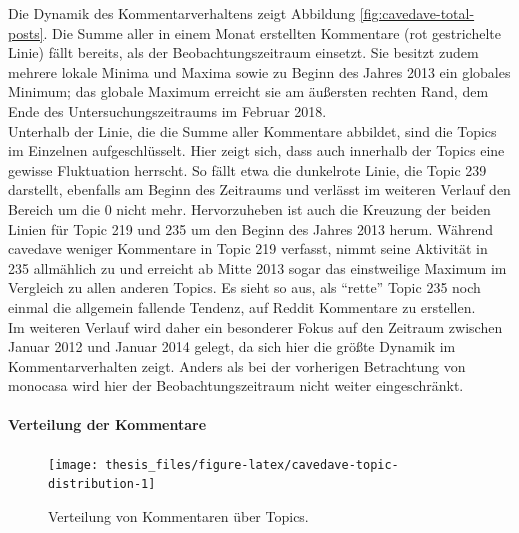 \documentclass[11pt,a4paper,twoside]{article}
\let\oldpar\paragraph
\renewcommand{\paragraph}{\oldpar*}
\begin{document}
Die Dynamik des Kommentarverhaltens zeigt Abbildung
\ref{fig:cavedave-total-posts}. Die Summe aller in einem Monat
erstellten Kommentare (rot gestrichelte Linie) fällt bereits, als der
Beobachtungszeitraum einsetzt. Sie besitzt zudem mehrere lokale Minima
und Maxima sowie zu Beginn des Jahres 2013 ein globales Minimum; das
globale Maximum erreicht sie am äußersten rechten Rand, dem Ende des
Untersuchungszeitraums im Februar 2018.\\
Unterhalb der Linie, die die Summe aller Kommentare abbildet, sind die
Topics im Einzelnen aufgeschlüsselt. Hier zeigt sich, dass auch
innerhalb der Topics eine gewisse Fluktuation herrscht. So fällt etwa
die dunkelrote Linie, die Topic 239 darstellt, ebenfalls am Beginn des
Zeitraums und verlässt im weiteren Verlauf den Bereich um die 0 nicht
mehr. Hervorzuheben ist auch die Kreuzung der beiden Linien für Topic
219 und 235 um den Beginn des Jahres 2013 herum. Während cavedave
weniger Kommentare in Topic 219 verfasst, nimmt seine Aktivität in 235
allmählich zu und erreicht ab Mitte 2013 sogar das einstweilige Maximum
im Vergleich zu allen anderen Topics. Es sieht so aus, als
\enquote{rette} Topic 235 noch einmal die allgemein fallende Tendenz,
auf Reddit Kommentare zu erstellen.\\
Im weiteren Verlauf wird daher ein besonderer Fokus auf den Zeitraum
zwischen Januar 2012 und Januar 2014 gelegt, da sich hier die größte
Dynamik im Kommentarverhalten zeigt. Anders als bei der vorherigen
Betrachtung von monocasa wird hier der Beobachtungszeitraum nicht weiter
eingeschränkt.

\hypertarget{verteilung-der-kommentare}{%
\paragraph{Verteilung der Kommentare}\label{verteilung-der-kommentare}}




\begin{figure}

{\centering \texttt{[image: thesis\_files/figure-latex/cavedave-topic-distribution-1]} 

}

\caption{Verteilung von Kommentaren über
Topics.}\label{fig:cavedave-topic-distribution}
\end{figure}
\end{document}
